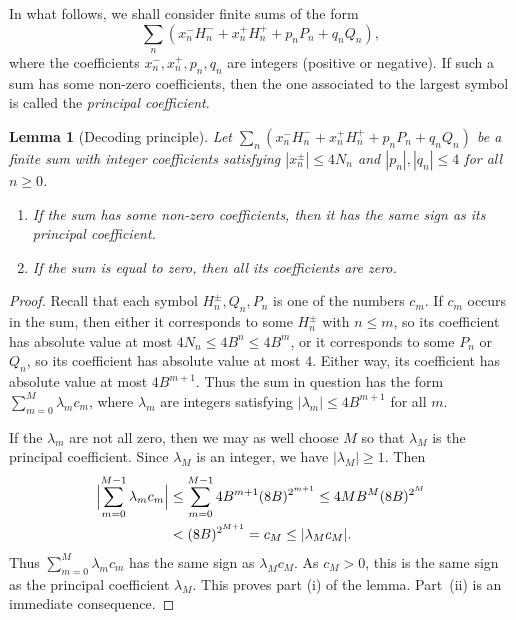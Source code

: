 \documentclass[11pt,reqno]{amsart}
\theoremstyle{plain}
\newtheorem{lemma}[theorem]{Lemma}
\theoremstyle{definition}
\theoremstyle{remark}
\begin{document}
In what follows,  we shall consider finite sums of the form 
\[
\sum_n (x_n^{-}H_n^{-} +x_n^{+}H_n^{+}+p_nP_n+q_nQ_n),
\]
where the coefficients $x_n^{-},x_n^{+},p_n,q_n$ are integers (positive or negative).
If such a sum has some non-zero coefficients,  then the one associated to the largest symbol 
is called the \emph{principal coefficient}.

\begin{lemma}[Decoding principle]\label{L:decode}
Let $\sum_n (x_n^{-}H_n^{-} +x_n^{+}H_n^{+}+p_nP_n+q_nQ_n)$
be a finite sum with integer coefficients satisfying $|x_n^{\pm}|\le 4N_n$ and $|p_n|,|q_n|\le 4$
for all $n\ge0$.
\begin{enumerate}[\normalfont(i)]
\item
 If the sum has some non-zero coefficients, then it has the same sign as its principal coefficient. 
 \item If the sum is equal to zero, then all its coefficients are zero.
 \end{enumerate}
\end{lemma}

\begin{proof}
Recall that each symbol $H_n^{\pm},Q_n,P_n$ is one of the numbers $c_m$. If $c_m$ occurs in the sum, then either it corresponds to
some $H_n^{\pm}$ with $n\le m$,   so its coefficient has absolute
value at most $4N_n\le 4B^n\le 4B^m$, or it corresponds to
some $P_n$ or $Q_n$, so its coefficient  has absolute value at most $4$. Either way, its coefficient has absolute value at most $4B^{m+1}$. Thus the sum in question has the form
$\sum_{m=0}^M\lambda_mc_m$, where $\lambda_m$ are integers satisfying
$|\lambda_m|\le 4B^{m+1}$ for all $m$.

If the $\lambda_m$ are not all zero, 
then we may as well choose $M$ so that $\lambda_M$ is the principal
coefficient.
Since $\lambda_M$ is an integer, we have $|\lambda_M|\ge1$.
Then
\begin{align*}
\Bigl|\sum_{m=0}^{M-1}\lambda_mc_m\Bigr|
&\le \sum_{m=0}^{M-1} 4B^{m+1}(8B)^{2^{m+1}}
\le 4MB^M(8B)^{2^M}\\
&<(8B)^{2^{M+1}}=c_M\le|\lambda_Mc_M|.
\end{align*}
Thus $\sum_{m=0}^M\lambda_mc_m$ has the same sign as $\lambda_Mc_M$. As $c_M>0$, this is the same sign as the principal coefficient $\lambda_M$.
This proves part (i) of the lemma. Part~(ii)
is an immediate consequence.
\end{proof}

\end{document}
